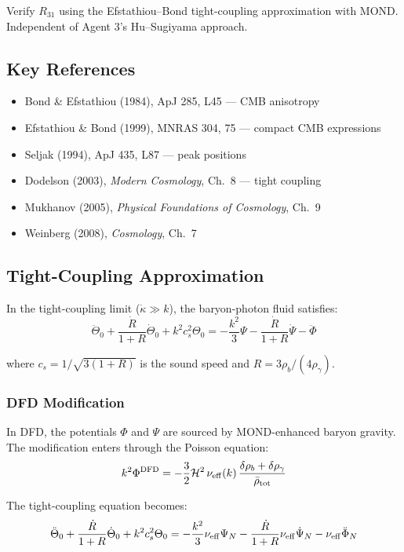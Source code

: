 \documentclass[11pt,a4paper]{article}
\begin{document}
Verify $R_{31}$ using the Efstathiou--Bond tight-coupling approximation with MOND. Independent of Agent 3's Hu--Sugiyama approach.

\subsection{Key References}

\begin{itemize}
\item Bond \& Efstathiou (1984), ApJ 285, L45 --- CMB anisotropy
\item Efstathiou \& Bond (1999), MNRAS 304, 75 --- compact CMB expressions
\item Seljak (1994), ApJ 435, L87 --- peak positions
\item Dodelson (2003), \emph{Modern Cosmology}, Ch.\ 8 --- tight coupling
\item Mukhanov (2005), \emph{Physical Foundations of Cosmology}, Ch.\ 9
\item Weinberg (2008), \emph{Cosmology}, Ch.\ 7
\end{itemize}

\subsection{Tight-Coupling Approximation}

In the tight-coupling limit ($\dot{\kappa} \gg k$), the baryon-photon fluid satisfies:
\begin{equation}
\ddot{\Theta}_0 + \frac{\dot{R}}{1+R}\dot{\Theta}_0 + k^2c_s^2\Theta_0 = -\frac{k^2}{3}\Psi - \frac{\dot{R}}{1+R}\dot{\Psi} - \ddot{\Phi}
\label{eq:tc}
\end{equation}

where $c_s = 1/\sqrt{3(1+R)}$ is the sound speed and $R = 3\rho_b/(4\rho_\gamma)$.

\subsubsection{DFD Modification}

In DFD, the potentials $\Phi$ and $\Psi$ are sourced by MOND-enhanced baryon gravity. The modification enters through the Poisson equation:
\begin{equation}
k^2\Phi^{\rm DFD} = -\frac{3}{2}\mathcal{H}^2\,\nu_{\rm eff}(k)\,\frac{\delta\rho_b + \delta\rho_\gamma}{\bar{\rho}_{\rm tot}}
\end{equation}

The tight-coupling equation becomes:
\begin{equation}
\ddot{\Theta}_0 + \frac{\dot{R}}{1+R}\dot{\Theta}_0 + k^2c_s^2\Theta_0 = -\frac{k^2}{3}\nu_{\rm eff}\Psi_N - \frac{\dot{R}}{1+R}\nu_{\rm eff}\dot{\Psi}_N - \nu_{\rm eff}\ddot{\Phi}_N
\end{equation}
\end{document}
